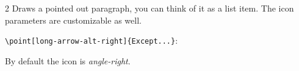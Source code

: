 \begin{paracol}{2}
    Draws a pointed out paragraph, you can think of it as a list item.
    The icon parameters are customizable as well.

    \begingroup\color{gray}\verb!\point[long-arrow-alt-right]{Except...}!:\endgroup

    By default the icon is \textit{angle-right}.


    \flushpage
  \end{paracol}

